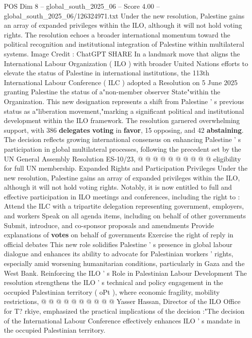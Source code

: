 \begin{textsample}{POS Dim 8 – global\_south\_2025\_06 – Score 4.00 – global\_south\_2025\_06/126324971.txt}  \label{ex:f8_pos_424}
Under the new resolution, Palestine gains an array of expanded privileges within the ILO, although it will not hold voting rights.
The resolution echoes a broader international momentum toward the political recognition and institutional integration of Palestine within multilateral systems.
Image Credit : ChatGPT SHARE In a landmark move that aligns the International Labour Organization ( ILO ) with broader United Nations efforts to elevate the status of Palestine in international institutions, the 113th International Labour Conference ( ILC ) adopted a Resolution on 5 June 2025 granting Palestine the status of a"non-member observer State"within the Organization.
This new designation represents a shift from Palestine ' s previous status as a"liberation movement,"marking a significant political and institutional development within the ILO framework.
The resolution garnered overwhelming support, with 386 \textbf{delegates} \textbf{voting} in \textbf{favor}, 15 opposing, and 42 \textbf{abstaining}.
The decision reflects growing international consensus on enhancing Palestine ' s participation in global multilateral processes, following the precedent set by the UN General Assembly Resolution ES-10/23, @ @ @ @ @ @ @ @ @ @ eligibility for full UN membership.
Expanded Rights and Participation Privileges Under the new resolution, Palestine gains an array of expanded privileges within the ILO, although it will not hold voting rights.
Notably, it is now entitled to full and effective participation in ILO meetings and conferences, including the right to : Attend the ILC with a tripartite delegation representing government, employers, and workers Speak on all agenda items, including on behalf of other governments Submit, introduce, and co-sponsor proposals and amendments Provide explanations of \textbf{votes} on behalf of governments Exercise the right of reply in official debates This new role solidifies Palestine ' s presence in global labour dialogue and enhances its ability to advocate for Palestinian workers ' rights, especially amid worsening humanitarian conditions, particularly in Gaza and the West Bank.
Reinforcing the ILO ' s Role in Palestinian Labour Development The resolution strengthens the ILO ' s technical and policy engagement in the occupied Palestinian territory ( oPt ), where economic fragility, mobility restrictions, @ @ @ @ @ @ @ @ @ @ Yasser Hassan, Director of the ILO Office for T? rkiye, emphasized the practical implications of the decision :"The decision of the International Labour Conference effectively enhances ILO ' s mandate in the occupied Palestinian territory.

\end{textsample}
